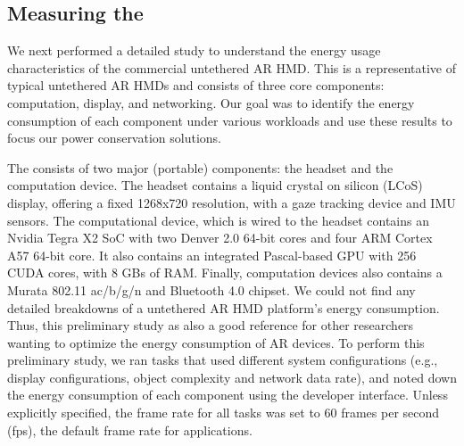 
\subsection{Measuring the {\mlo}}

We next performed a detailed study to understand the energy usage characteristics of the {\mlo} commercial untethered AR HMD.  This is a representative of typical untethered AR HMDs and consists of three core components: computation, 
display, and networking.  Our goal was to identify the energy consumption of each component under various workloads and use these results to focus our power conservation solutions. 

%
%
The \mlo consists of two major (portable) components: the headset and 
the computation device. The headset contains a liquid crystal on silicon (LCoS) 
display, offering a fixed 1268x720 resolution, with a gaze tracking device and IMU sensors. The computational device,
which is wired to the headset contains an Nvidia Tegra X2 SoC with two Denver
2.0 64-bit cores and four ARM Cortex A57 64-bit core. It also contains an integrated Pascal-based GPU with 256 CUDA cores, with 8 GBs of RAM. 
Finally, computation devices also contains a Murata 802.11 ac/b/g/n and Bluetooth 4.0 chipset.
%
We could not find any detailed breakdowns of a untethered AR HMD platform's energy consumption. Thus, this preliminary study as also a good reference for other researchers wanting to optimize the energy consumption of AR devices. To perform this preliminary study, we ran tasks that used different system configurations 
(e.g., display configurations, object complexity and network data rate), and noted down the energy consumption of each component using the {\mlo} developer interface. Unless explicitly specified, the frame rate for all tasks was set to 60 frames per second (fps), the  default frame rate for {\mlo} applications.


